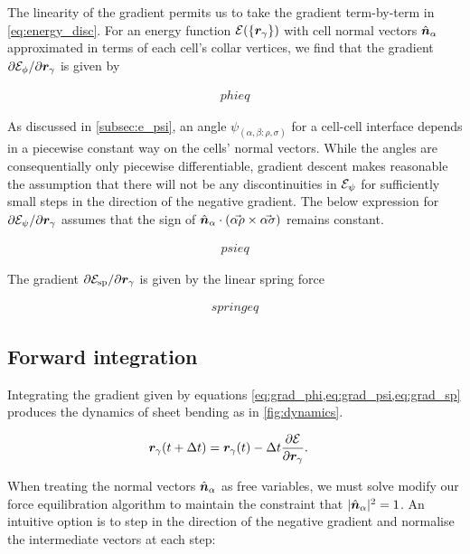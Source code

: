 The linearity of the gradient permits us to take the gradient term-by-term in \cref{eq:energy_disc}. For an energy function $\mathcal{E}(\{ \bm{r}_\gamma\})$ with cell normal vectors $\hat{\bm{n}}_\alpha$ approximated in terms of each cell's collar vertices, we find that the gradient $\partial \mathcal{E}_\phi / \partial \bm{r}_\gamma$ is given by 

\begin{align}
	phi eq \label{eq:grad_phi}
\end{align}


As discussed in \ref{subsec:e_psi}, an angle $\psi_{(\alpha, \beta: \rho, \sigma)}$ for a cell-cell interface depends in a piecewise constant way on the cells' normal vectors. While the angles are consequentially only piecewise differentiable, gradient descent makes reasonable the assumption that there will not be any discontinuities in $\mathcal{E}_\psi$ for sufficiently small steps in the direction of the negative gradient. The below expression for $\partial \mathcal{E}_\psi / \partial \bm{r}_\gamma$ assumes that the sign of $\hat{\bm{n}}_\alpha \cdot (\vec{\alpha\rho}\times \vec{\alpha\sigma})$ remains constant.

\begin{align}
	psi eq \label{eq:grad_psi}
\end{align}

The gradient $\partial \mathcal{E}_{\text{sp}} / \partial \bm{r}_\gamma$ is given by the linear spring force 

\begin{align}
	spring eq \label{eq:grad_sp}
\end{align}

\subsection{Forward integration}

Integrating the gradient given by equations \cref{eq:grad_phi,eq:grad_psi,eq:grad_sp} produces the dynamics of sheet bending as in \cref{fig:dynamics}. 

\begin{align}
	\bm{r}_\gamma(t+\Delta t) &= \bm{r}_\gamma (t) - \Delta t \frac{\partial \mathcal{E}}{\partial \bm{r}_\gamma}. \label{eq:grad_desc_r}
\end{align}

When treating the normal vectors $\hat{\bm{n}}_\alpha$ as free variables, we must solve modify our force equilibration algorithm to maintain the constraint that $| \hat{\bm{n}}_\alpha |^2 = 1$. 
An intuitive option is to step in the direction of the negative gradient and normalise the intermediate vectors at each step:

